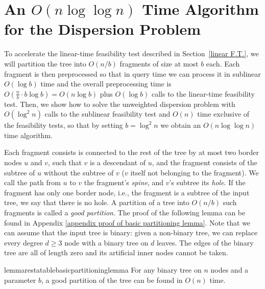 \documentclass[a4paper,UKenglish]{lipics-v2016}
\theoremstyle{plain}
\begin{document}
\section{An \texorpdfstring{\boldmath$O(n\log\log n)$}{O(nloglogn)} Time Algorithm for the Dispersion Problem}
\label{sublinear f.t.}

To accelerate the linear-time feasibility test described in Section~\ref{linear F.T.}, we will partition the tree into $O(n/b)$ fragments of size at most
$b$ each. Each fragment is then preprocessed so that in query time we can process it in sublinear $O(\log b)$ time and the overall preprocessing time
is $O(\frac{n}{b}\cdot b\log b)=O(n\log b)$ plus $O(\log b)$ calls to the linear-time feasibility test.
Then, we show how to solve the unweighted dispersion problem with $O(\log^{2}n)$ calls to the sublinear
feasibility test and $O(n)$ time exclusive of the feasibility tests, so that by setting $b=\log^{2}n$ we obtain an $O(n\log\log n)$ time algorithm.

Each fragment consists is connected to the rest of the tree by at most two border nodes $u$ and $v$, such that $v$ is a
descendant of $u$, and the fragment consists of the subtree of $u$ without the subtree of $v$ ($v$ itself not belonging to
the fragment).  We call the path from $u$ to $v$ the fragment's \textit{spine}, and $v$'s subtree its \textit{hole}. If the
fragment has only one border node, i.e., the fragment is a subtree of the input tree, we say that there is no hole.
A partition of a tree into $O(n/b)$ such fragments is called a \emph{good partition}.
The proof of the following lemma can be found in Appendix \ref{appendix proof of basic partitioning lemma}.
Note that we can assume that the input tree is binary: given a non-binary tree, we can replace every degree $d\geq 3$ node with a binary tree on
$d$ leaves. The edges of the binary tree are all of length zero and its artificial inner nodes cannot be taken.

\begin{restatable}{lemmarestatable}{basicpartitioninglemma}
\label{basic partitioning lemma}
For any binary tree on $n$ nodes and a parameter $b$, a good partition of the tree can be found in $O(n)$ time.
\end{restatable}
\end{document}
